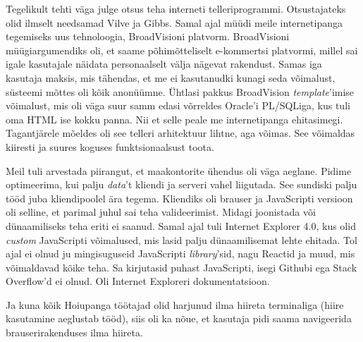 Tegelikult tehti väga julge otsus teha interneti telleriprogrammi. Otsustajateks olid ilmselt needsamad Vilve ja 
Gibbs. Samal ajal müüdi meile internetipanga tegemiseks uus tehnoloogia, BroadVisioni platvorm. 
BroadVisioni müügiargumendiks oli, et saame põhimõtteliselt e-kommertsi 
platvormi, millel sai igale kasutajale näidata personaalselt välja nägevat 
rakendust.
Samas iga kasutaja maksis, mis tähendas, et me ei kasutanudki kunagi seda
võimalust, süsteemi mõttes oli kõik anonüümne. Ühtlasi pakkus BroadVision
\emph{template}'imise võimalust, mis oli väga suur samm edasi võrreldes Oracle'i 
PL/SQLiga, kus tuli oma HTML ise kokku panna. Nii et selle peale me internetipanga ehitasimegi. 
Tagantjärele mõeldes oli see telleri arhitektuur lihtne, aga võimas. See võimaldas 
kiiresti ja suures koguses funktsionaalsust toota.


Meil tuli arvestada piirangut, et maakontorite ühendus oli väga aeglane. 
Pidime optimeerima, kui palju \emph{data}'t kliendi ja serveri 
vahel liigutada. See sundiski palju tööd juba 
kliendipoolel ära tegema. Kliendiks oli brauser ja JavaScripti versioon oli 
selline, et parimal juhul sai teha valideerimist. Midagi joonistada või dünaamiliseks teha eriti
ei saanud. Samal ajal tuli 
Internet Explorer 4.0, kus olid \emph{custom} 
JavaScripti võimalused, mis lasid palju dünaamilisemat 
lehte ehitada. Tol ajal ei olnud ju mingisuguseid JavaScripti \emph{library}'sid, nagu 
Reactid ja muud, mis võimaldavad kõike teha. Sa kirjutasid puhast 
JavaScripti, isegi Githubi ega Stack Overflow'd ei olnud. Oli Internet Exploreri 
dokumentatsioon.

Ja kuna kõik Hoiupanga töötajad olid harjunud ilma hiireta
terminaliga (hiire kasutamine aeglustab tööd), siis oli ka 
nõue, et kasutaja pidi saama navigeerida brauserirakenduses ilma hiireta. 


